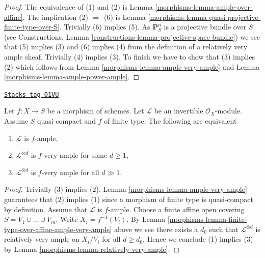 \begin{proof}

The equivalence of (1) and (2) is Lemma \ref{morphisms-lemma-ample-over-affine}.
The implication (2) $\Rightarrow$ (6) is
Lemma \ref{morphisms-lemma-quasi-projective-finite-type-over-S}.
Trivially (6) implies (5).
As $\mathbf{P}^n_S$ is a projective bundle over $S$ (see
Constructions, Lemma \ref{constructions-lemma-projective-space-bundle})
we see that
(5) implies (3) and (6) implies (4) from the definition of a
relatively very ample sheaf.
Trivially (4) implies (3). To finish we have to show that
(3) implies (2) which follows from Lemma \ref{morphisms-lemma-ample-very-ample}
and Lemma \ref{morphisms-lemma-ample-power-ample}.
\end{proof}

\begin{lemma}
\label{morphisms-lemma-finite-type-ample-very-ample}
\href{https://stacks.math.columbia.edu/tag/01VU}{\texttt{Stacks tag 01VU}}

Let $f : X \to S$ be a morphism of schemes.
Let $\mathcal{L}$ be an invertible $\mathcal{O}_X$-module.
Assume $S$ quasi-compact and $f$ of finite type.
The following are equivalent
\begin{enumerate}
\item $\mathcal{L}$ is $f$-ample,
\item $\mathcal{L}^{\otimes d}$ is $f$-very ample for some $d \geq 1$,
\item $\mathcal{L}^{\otimes d}$ is $f$-very ample for all $d \gg 1$.
\end{enumerate}
\end{lemma}

\begin{proof}

Trivially (3) implies (2). Lemma \ref{morphisms-lemma-ample-very-ample} guarantees that
(2) implies (1) since a morphism of finite type is quasi-compact
by definition. Assume that $\mathcal{L}$ is $f$-ample. Choose a finite affine
open covering $S = V_1 \cup \ldots \cup V_m$. Write $X_i = f^{-1}(V_i)$.
By Lemma \ref{morphisms-lemma-finite-type-over-affine-ample-very-ample} above we see
there exists a $d_0$ such that $\mathcal{L}^{\otimes d}$ is
relatively very ample on $X_i/V_i$ for all $d \geq d_0$. Hence we conclude
(1) implies (3) by Lemma \ref{morphisms-lemma-relatively-very-ample}.
\end{proof}

